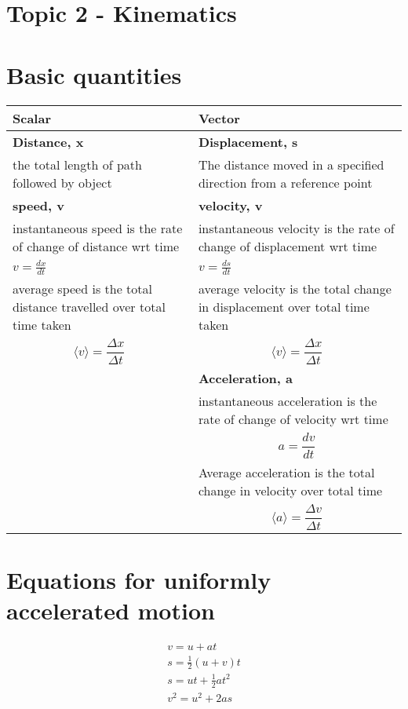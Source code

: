 \documentclass[a4paper, 10pt]{article}
\begin{document}
\section*{Topic 2 - Kinematics}

\section{Basic quantities}

\begin{center}
   \begin{tabularx}{\textwidth}{X|X}
      \hline
      Scalar & Vector \\
      \hline
      \hline
      \textbf{Distance, x} & \textbf{Displacement, s} \\
      the total length of path followed by object & The distance moved in a specified direction from a reference point \\
      \hline
      \textbf{speed, v} & \textbf{velocity, v} \\
      instantaneous speed is the rate of change of distance wrt time
      & instantaneous velocity is the rate of change of displacement wrt time \\
      $v = \frac{dx}{dt}$
      &
      $v = \frac{ds}{dt}$
       \\
      \hline
      average speed is the total distance travelled over total time taken &
      average velocity is the total change in displacement over total time taken \\
      \[
         \langle v \rangle = \frac{\Delta x}{\Delta t}
      \] &
      \[
         \langle v \rangle = \frac{\Delta x}{\Delta t}
      \] \\
      \hline
      & \textbf{Acceleration, a} \\
      & instantaneous acceleration is the rate of change of velocity wrt time \\
      & \[
         a = \frac{dv}{dt}
      \] \\ 
      \hline
      & Average acceleration is the total change in velocity over total time \\
      & \[
         \langle a \rangle = \frac{\Delta v}{\Delta t}
      \]  \\
   \end{tabularx}
\end{center}

\section{Equations for uniformly accelerated motion}
\begin{eqnarray}
   v = u + at \\
   s = \frac{1}{2} (u+v) t \\
   s = ut + \frac{1}{2} at^2 \\
   v^2 = u^2 + 2as
\end{eqnarray}	
\end{document}

